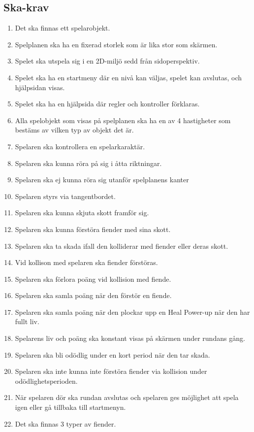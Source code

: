 \documentclass{TDP005mall}
\begin{document}
\subsection{Ska-krav}
\begin{enumerate}
\item Det ska finnas ett spelarobjekt.
\item Spelplanen ska ha en fixerad storlek som är lika stor som skärmen.
\item Spelet ska utspela sig i en 2D-miljö sedd från sidoperspektiv.
\item Spelet ska ha en startmeny där en nivå kan väljas, spelet kan avslutas, och hjälpsidan visas.
\item Spelet ska ha en hjälpsida där regler och kontroller förklaras.
\item Alla spelobjekt som visas på spelplanen ska ha en av 4 hastigheter som bestäms av vilken typ av objekt det är.
\item Spelaren ska kontrollera en spelarkaraktär.
\item Spelaren ska kunna röra på sig i åtta riktningar.
\item Spelaren ska ej kunna röra sig utanför spelplanens kanter
\item Spelaren styrs via tangentbordet. %
\item Spelaren ska kunna skjuta skott framför sig.
\item Spelaren ska kunna förstöra fiender med sina skott.
\item Spelaren ska ta skada ifall den kolliderar med fiender eller deras skott.
\item Vid kollison med spelaren ska fiender förstöras.
\item Spelaren ska förlora poäng vid kollision med fiende.
\item Spelaren ska samla poäng när den förstör en fiende.
\item Spelaren ska samla poäng när den plockar upp en Heal Power-up när den har fullt liv.
\item Spelarens liv och poäng ska konstant visas på skärmen under rundans gång.
\item Spelaren ska bli odödlig under en kort period när den tar skada.
\item Spelaren ska inte kunna inte förstöra fiender via kollision under odödlighetsperioden. %
\item När spelaren dör ska rundan avslutas och spelaren ges möjlighet att spela igen eller gå tillbaka till startmenyn. 
\item Det ska finnas 3 typer av fiender.

\end{enumerate}
\end{document}
